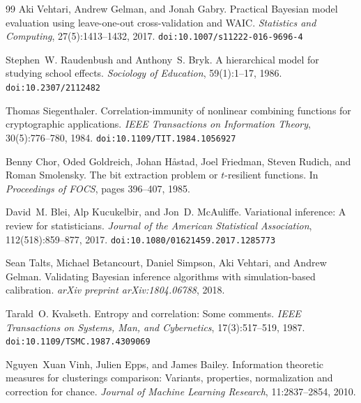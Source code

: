 \documentclass[10pt]{article} %
\theoremstyle{plain}
\theoremstyle{definition}
\begin{document}
\begin{thebibliography}{99}
Aki Vehtari, Andrew Gelman, and Jonah Gabry.
\newblock Practical {Bayesian} model evaluation using leave-one-out cross-validation and {WAIC}.
\newblock \emph{Statistics and Computing}, 27(5):1413--1432, 2017.
\newblock \texttt{doi:10.1007/s11222-016-9696-4}

Stephen~W. Raudenbush and Anthony~S. Bryk.
\newblock A hierarchical model for studying school effects.
\newblock \emph{Sociology of Education}, 59(1):1--17, 1986.
\newblock \texttt{doi:10.2307/2112482}

Thomas Siegenthaler.
\newblock Correlation-immunity of nonlinear combining functions for cryptographic applications.
\newblock \emph{IEEE Transactions on Information Theory}, 30(5):776--780, 1984.
\newblock \texttt{doi:10.1109/TIT.1984.1056927}

Benny Chor, Oded Goldreich, Johan H{\aa}stad, Joel Friedman, Steven Rudich, and Roman Smolensky.
\newblock The bit extraction problem or $t$-resilient functions.
\newblock In \emph{Proceedings of FOCS}, pages 396--407, 1985.

David~M. Blei, Alp Kucukelbir, and Jon~D. McAuliffe.
\newblock Variational inference: A review for statisticians.
\newblock \emph{Journal of the American Statistical Association}, 112(518):859--877, 2017.
\newblock \texttt{doi:10.1080/01621459.2017.1285773}

Sean Talts, Michael Betancourt, Daniel Simpson, Aki Vehtari, and Andrew Gelman.
\newblock Validating {Bayesian} inference algorithms with simulation-based calibration.
\newblock \emph{arXiv preprint arXiv:1804.06788}, 2018.

Tarald~O. Kvalseth.
\newblock Entropy and correlation: Some comments.
\newblock \emph{IEEE Transactions on Systems, Man, and Cybernetics}, 17(3):517--519, 1987.
\newblock \texttt{doi:10.1109/TSMC.1987.4309069}

Nguyen~Xuan Vinh, Julien Epps, and James Bailey.
\newblock Information theoretic measures for clusterings comparison: Variants, properties, normalization and correction for chance.
\newblock \emph{Journal of Machine Learning Research}, 11:2837--2854, 2010.


\end{thebibliography}
\end{document}
